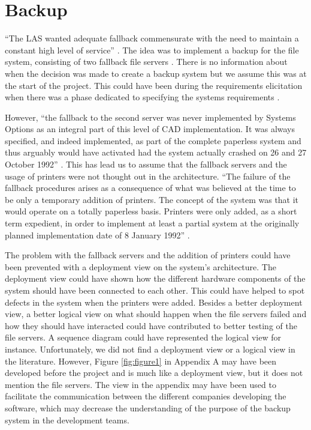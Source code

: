 \section*{Backup}

``The LAS wanted adequate fallback commensurate with the need to maintain a constant high level of service'' \cite[s5038]{officialreport}.
The idea was to implement a backup for the file system, consisting of two fallback file servers \cite[s3132]{officialreport}.
There is no information about when the decision was made to create a backup system but we assume this was at the start of the project.
This could have been during the requirements elicitation when there was a phase dedicated to specifying the systems requirements \cite[s2018a]{officialreport}.

However, ``the fallback to the second server was never implemented by Systems Options as an integral part of this level of CAD implementation.
It was always specified, and indeed implemented, as part of the complete paperless system and thus arguably would have activated had the system actually crashed on 26 and 27 October 1992'' \cite[s4041]{officialreport}.
This has lead us to assume that the fallback servers and the usage of printers were not thought out in the architecture.
``The failure of the fallback procedures arises as a consequence of what was believed at the time to be only a temporary addition of printers.
The concept of the system was that it would operate on a totally paperless basis.
Printers were only added, as a short term expedient, in order to implement at least a partial system at the originally planned implementation date of 8 January 1992'' \cite[s4040]{officialreport}.

The problem with the fallback servers and the addition of printers could have been prevented with a deployment view on the system's architecture.
The deployment view could have shown how the different hardware components of the system should have been connected to each other.
This could have helped to spot defects in the system when the printers were added.
Besides a better deployment view, a better logical view on what should happen when the file servers failed and how they should have interacted could have contributed to better testing of the file servers.
A sequence diagram could have represented the logical view for instance.
Unfortunately, we did not find a deployment view or a logical view in the literature.
However, Figure \ref{fig:figure1} in Appendix A may have been developed before the project and is much like a deployment view, but it does not mention the file servers.
The view in the appendix may have been used to facilitate the communication between the different companies developing the software,
which may decrease the understanding of the purpose of the backup system in the development teams.

